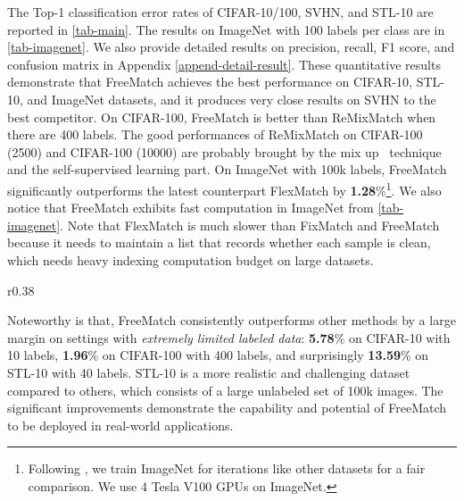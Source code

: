 \documentclass{article} \usepackage{iclr2023_conference,times}
\theoremstyle{plain}
\theoremstyle{definition}
\theoremstyle{remark}
\newcommand{\ourmethod}{FreeMatch\xspace}
\begin{document}
The Top-1 classification error rates of CIFAR-10/100, SVHN, and STL-10 are reported in \cref{tab-main}.
The results on ImageNet with 100 labels per class are in \cref{tab-imagenet}.
We also provide detailed results on precision, recall, F1 score, and confusion matrix in Appendix \ref{append-detail-result}.
These quantitative results demonstrate that \ourmethod achieves the best performance on CIFAR-10, STL-10, and ImageNet datasets, and it produces very close results on SVHN to the best competitor. On CIFAR-100, \ourmethod is better than ReMixMatch when there are 400 labels. The good performances of ReMixMatch on CIFAR-100 (2500) and CIFAR-100 (10000) are probably brought by the mix up~\citep{zhang2017mixup} technique and the self-supervised learning part.
On ImageNet with 100k labels, \ourmethod significantly outperforms the latest counterpart FlexMatch by \textbf{1.28}\%\footnote{Following \citep{zhang2021flexmatch}, we train ImageNet for  iterations like other datasets for a fair comparison. We use 4 Tesla V100 GPUs on ImageNet. }.
We also notice that \ourmethod exhibits fast computation in ImageNet from \cref{tab-imagenet}.
Note that FlexMatch is much slower than FixMatch and \ourmethod because it needs to maintain a list that records whether each sample is clean, which needs heavy indexing computation budget on large datasets.

\begin{wraptable}{r}{0.38\textwidth}
    \centering
    \vspace{-.1in}
    \caption{Error rates and runtime on ImageNet with 100 labels per class.}
    \label{tab-imagenet}
\end{wraptable}

Noteworthy is that, \ourmethod consistently outperforms other methods by a large margin on settings with \emph{extremely limited labeled data}: \textbf{5.78}\% on CIFAR-10 with 10 labels, \textbf{1.96}\% on CIFAR-100 with 400 labels, and surprisingly \textbf{13.59}\% on STL-10 with 40 labels.
STL-10 is a more realistic and challenging dataset compared to others, which consists of a large unlabeled set of 100k images.
The significant improvements demonstrate the capability and potential of \ourmethod to be deployed in real-world applications.
\end{document}
